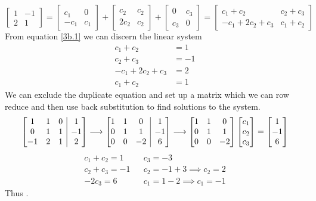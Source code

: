 \documentclass[]{article}
\makeatletter
\newenvironment{augmx}[1]{%
	\left[\begin{array}{@{}*{#1}{c}|c@{}}
	}{%
	\end{array}\right]
}
\newcommand{\bmat}[1]{\begin{bmatrix}#1\end{bmatrix}}
\makeatother
\begin{document}
\subsection{}
\begin{equation}
	\label{3b.1}
	\bmat{1&-1\\2&1} = \bmat{c_1&0\\-c_1&c_1} + \bmat{c_2&c_2\\2c_2&c_2} + \bmat{0&c_3\\c_3&0} = \bmat{c_1 + c_2 & c_2 + c_3 \\ -c_1 + 2c_2 + c_3 & c_1 + c_2}
\end{equation}
From equation \ref{3b.1} we can discern the linear system
\begin{align*}
	c_1 + c_2 &= 1\\
	c_2 + c_3 &= -1\\
	-c_1 + 2c_2 + c_3 &= 2\\
	c_1 + c_2 &= 1
\end{align*}
We can exclude the duplicate equation and set up a matrix which we can row reduce and then use back substitution to find solutions to the system.
\begin{align*}
	\begin{augmx}{3}1&1&0&1\\0&1&1&-1\\-1&2&1&2\end{augmx} \longrightarrow \begin{augmx}{3}1&1&0&1\\0&1&1&-1\\0&0&-2&6\end{augmx} \longrightarrow \bmat{1&1&0\\0&1&1\\0&0&-2}\bmat{c_1\\c_2\\c_3} = \bmat{1\\-1\\6}
\end{align*}
\begin{align*}
	c_1 + c_2 = 1 & & c_3 = -3\\
	c_2 + c_3 = -1 & & c_2 = -1 + 3 \implies c_2 = 2\\
	-2c_3 = 6 & & c_1 = 1 - 2 \implies c_1 = -1
\end{align*}
Thus .
\end{document}
